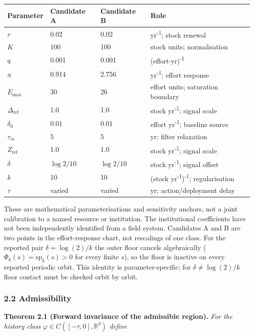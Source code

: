\documentclass[11pt]{article}
\begin{document}
\begin{longtable}[]{@{}llll@{}}
\toprule\noalign{}
Parameter & Candidate A & Candidate B & Role \\
\midrule\noalign{}
\endhead
\bottomrule\noalign{}
\endlastfoot
\(r\) & 0.02 & 0.02 & yr\textsuperscript{-1}; stock renewal \\
\(K\) & 100 & 100 & stock units; normalisation \\
\(q\) & 0.001 & 0.001 & (effort\ensuremath{\cdot}yr)\textsuperscript{-1} \\
\(\eta\) & 0.914 & 2.756 & yr\textsuperscript{-1}; effort response \\
\(E_{\max}\) & 30 & 26 & effort units; saturation boundary \\
\(\Delta_{\mathrm{ref}}\) & 1.0 & 1.0 & stock yr\textsuperscript{-1}; signal scale \\
\(\delta_0\) & 0.01 & 0.01 & effort yr\textsuperscript{-1}; baseline source \\
\(\tau_m\) & 5 & 5 & yr; filter relaxation \\
\(Z_{\mathrm{ref}}\) & 1.0 & 1.0 & stock yr\textsuperscript{-1}; signal scale \\
\(\delta\) & \(\log 2/10\) & \(\log 2/10\) & stock yr\textsuperscript{-1}; signal
offset \\
\(k\) & 10 & 10 & (stock yr\textsuperscript{-1})\textsuperscript{-1}; regularisation \\
\(\tau\) & varied & varied & yr; action/deployment delay \\
\end{longtable}

These are mathematical parameterisations and sensitivity anchors, not a
joint calibration to a named resource or institution. The institutional
coefficients have not been independently identified from a field system.
Candidates A and B are two points in the effort-response chart, not
rescalings of one class. For the reported pair \(\delta = \log(2)/k\)
the outer floor cancels algebraically
(\(\Phi_k(s) = \mathrm{sp}_k(s) > 0\) for every finite \(s\)), so the
floor is inactive on every reported periodic orbit. This identity is
parameter-specific; for \(\delta \ne \log(2)/k\) floor contact must be
checked orbit by orbit.

\subsubsection{2.2 Admissibility}\label{admissibility}

\textbf{Theorem 2.1 (Forward invariance of the admissible region).}
\emph{For the history class \(\varphi \in C([-\tau, 0], \mathbb{R}^3)\)
define}
\end{document}
